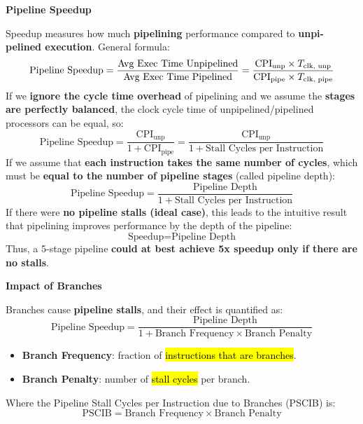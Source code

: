 \begin{flushleft}
    \textcolor{Green3}{ \textbf{Pipeline Speedup}}
\end{flushleft}
Speedup measures how much \textbf{pipelining} performance compared to \textbf{unpi-\break pelined execution}. General formula:
\begin{equation}\index{Formula Speedup: Pipeline Speedup}
    \text{Pipeline Speedup} =
    \dfrac{\text{Avg Exec Time Unpipelined}}{\text{Avg Exec Time Pipelined}} =
    \dfrac{\text{CPI}_{\text{unp}} \times T_{\text{clk, unp}}}{\text{CPI}_{\text{pipe}} \times T_{\text{clk, pipe}}}
\end{equation}
If we \textbf{ignore the cycle time overhead} of pipelining and we assume the \textbf{stages are perfectly balanced}, the clock cycle time of unpipelined/pipelined processors can be equal, so:
\begin{equation}
    \text{Pipeline Speedup} = \dfrac{\text{CPI}_{\text{unp}}}{1 + \text{CPI}_{\text{pipe}}} = \dfrac{\text{CPI}_{\text{unp}}}{1 + \text{Stall Cycles per Instruction}}
\end{equation}
If we assume that \textbf{each instruction takes the same number of cycles}, which must be \textbf{equal to the number of pipeline stages} (called pipeline depth):
\begin{equation}
    \text{Pipeline Speedup} = \frac{\text{Pipeline Depth}}{1 + \text{Stall Cycles per Instruction}}
\end{equation}
If there were \textbf{no pipeline stalls (ideal case)}, this leads to the intuitive result that pipelining improves performance by the depth of the pipeline:
\begin{equation}
    \text{Speedup} = \text{Pipeline Depth}
\end{equation}
Thus, a 5-stage pipeline \textbf{could at best achieve 5x speedup only if there are no stalls}.

\highspace
\begin{flushleft}
    \textcolor{Green3}{ \textbf{Impact of Branches}}
\end{flushleft}
Branches cause \textbf{pipeline stalls}, and their effect is quantified as:
\begin{equation}
    \text{Pipeline Speedup} = \frac{\text{Pipeline Depth}}{1 + \text{Branch Frequency} \times \text{Branch Penalty}}    
\end{equation}
\begin{itemize}
    \item \textbf{Branch Frequency}: fraction of \hl{instructions that are branches}.
    \item \textbf{Branch Penalty}: number of \hl{stall cycles} per branch.
\end{itemize}
Where the Pipeline Stall Cycles per Instruction due to Branches (PSCIB) is:
\begin{equation}
    \text{PSCIB} = \text{Branch Frequency} \times \text{Branch Penalty}
\end{equation}